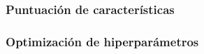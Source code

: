 




\subsubsection{Puntuación de características}


\subsubsection{Optimización de hiperparámetros}

